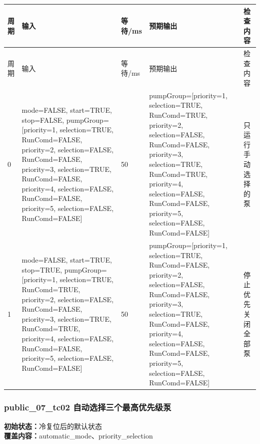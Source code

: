 \begin{longtable}{L{1.0cm}L{4.7cm}L{1.4cm}L{4.0cm}L{2.1cm}}

\toprule

周期 & 输入 & 等待/ms & 预期输出 & 检查内容\\

\midrule

\endfirsthead

\toprule

周期 & 输入 & 等待/ms & 预期输出 & 检查内容\\

\midrule

\endhead

0 & mode=FALSE, start=TRUE, stop=FALSE, pumpGroup=[priority=1, selection=TRUE, RunComd=FALSE, priority=2, selection=FALSE, RunComd=FALSE, priority=3, selection=TRUE, RunComd=FALSE, priority=4, selection=FALSE, RunComd=FALSE, priority=5, selection=FALSE, RunComd=FALSE] & 50 & pumpGroup=[priority=1, selection=TRUE, RunComd=TRUE, priority=2, selection=FALSE, RunComd=FALSE, priority=3, selection=TRUE, RunComd=TRUE, priority=4, selection=FALSE, RunComd=FALSE, priority=5, selection=FALSE, RunComd=FALSE] & 只运行手动选择的泵\\

1 & mode=FALSE, start=TRUE, stop=TRUE, pumpGroup=[priority=1, selection=TRUE, RunComd=TRUE, priority=2, selection=FALSE, RunComd=FALSE, priority=3, selection=TRUE, RunComd=TRUE, priority=4, selection=FALSE, RunComd=FALSE, priority=5, selection=FALSE, RunComd=FALSE] & 50 & pumpGroup=[priority=1, selection=TRUE, RunComd=FALSE, priority=2, selection=FALSE, RunComd=FALSE, priority=3, selection=TRUE, RunComd=FALSE, priority=4, selection=FALSE, RunComd=FALSE, priority=5, selection=FALSE, RunComd=FALSE] & 停止优先关闭全部泵\\

\bottomrule

\end{longtable}

\subsubsection{{\ttfamily public\_07\_tc02} 自动选择三个最高优先级泵}

\noindent\textbf{初始状态：}冷复位后的默认状态\\

\textbf{覆盖内容：}automatic\_mode、priority\_selection

